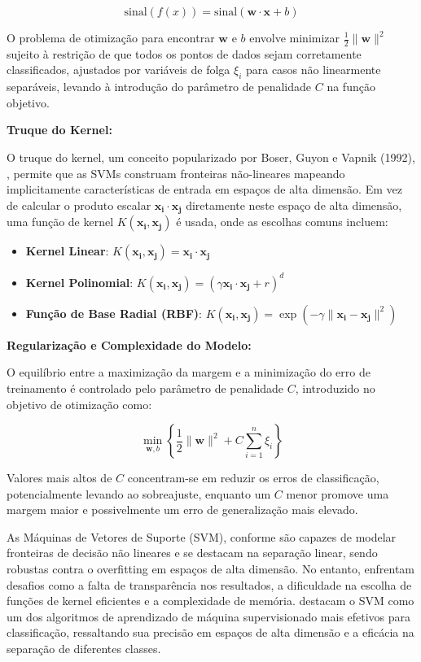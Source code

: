 \[
\text{sinal}(f(x)) = \text{sinal}(\mathbf{w} \cdot \mathbf{x} + b)
\]

O problema de otimização para encontrar \(\mathbf{w}\) e \(b\) envolve minimizar \(\frac{1}{2}\|\mathbf{w}\|^2\) sujeito à restrição de que todos os pontos de dados sejam corretamente classificados, ajustados por variáveis de folga \(\xi_i\) para casos não linearmente separáveis, levando à introdução do parâmetro de penalidade \(C\) na função objetivo.

\textbf{Truque do Kernel:}

O truque do kernel, um conceito popularizado por Boser, Guyon e Vapnik (1992), \cite{boser1992training}, permite que as SVMs construam fronteiras não-lineares mapeando implicitamente características de entrada em espaços de alta dimensão. Em vez de calcular o produto escalar \(\mathbf{x_i} \cdot \mathbf{x_j}\) diretamente neste espaço de alta dimensão, uma função de kernel \(K(\mathbf{x_i}, \mathbf{x_j})\) é usada, onde as escolhas comuns incluem:

\begin{itemize}
    \item \textbf{Kernel Linear}: \(K(\mathbf{x_i}, \mathbf{x_j}) = \mathbf{x_i} \cdot \mathbf{x_j}\)
    \item \textbf{Kernel Polinomial}: \(K(\mathbf{x_i}, \mathbf{x_j}) = (\gamma \mathbf{x_i} \cdot \mathbf{x_j} + r)^d\)
    \item \textbf{Função de Base Radial (RBF)}: \(K(\mathbf{x_i}, \mathbf{x_j}) = \exp(-\gamma \|\mathbf{x_i} - \mathbf{x_j}\|^2)\)
\end{itemize}

\textbf{Regularização e Complexidade do Modelo:}

O equilíbrio entre a maximização da margem e a minimização do erro de treinamento é controlado pelo parâmetro de penalidade \(C\), introduzido no objetivo de otimização como:

\[
\min_{\mathbf{w}, b} \left\{ \frac{1}{2} \|\mathbf{w}\|^2 + C \sum_{i=1}^{n} \xi_i \right\}
\]

Valores mais altos de \(C\) concentram-se em reduzir os erros de classificação, potencialmente levando ao sobreajuste, enquanto um \(C\) menor promove uma margem maior e possivelmente um erro de generalização mais elevado.

As Máquinas de Vetores de Suporte (SVM), conforme \cite{kowsari2019text} são capazes de modelar fronteiras de decisão não lineares e se destacam na separação linear, sendo robustas contra o overfitting em espaços de alta dimensão. No entanto, enfrentam desafios como a falta de transparência nos resultados, a dificuldade na escolha de funções de kernel eficientes e a complexidade de memória.  \cite{bhavani2021review} destacam o SVM como um dos algoritmos de aprendizado de máquina supervisionado mais efetivos para classificação, ressaltando sua precisão em espaços de alta dimensão e a eficácia na separação de diferentes classes.

